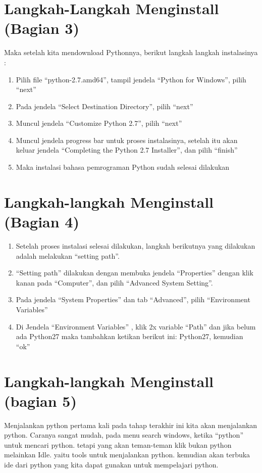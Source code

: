 \documentclass[12pt, times new roman, a4paper]{article}
\begin{document}
\section{Langkah-Langkah Menginstall (Bagian 3)}
Maka setelah kita mendownload Pythonnya, berikut langkah langkah instalasinya :
\begin{enumerate}
  \item Pilih file “python-2.7.amd64”, tampil jendela “Python for Windows”, pilih “next”
  \item Pada jendela “Select Destination Directory”, pilih “next”
  \item Muncul jendela “Customize Python 2.7”, pilih “next”
  \item Muncul jendela progress bar untuk proses instalasinya, setelah itu akan keluar jendela “Completing the Python 2.7 Installer”, dan pilih “finish”
  \item Maka instalasi bahasa pemrograman Python sudah selesai dilakukan
\end{enumerate}

\section{Langkah-langkah Menginstall (Bagian 4)}
\begin{enumerate}
  \item Setelah proses instalasi selesai dilakukan, langkah berikutnya yang
dilakukan adalah melakukan “setting path”.
  \item “Setting path” dilakukan dengan membuka jendela “Properties” dengan klik
kanan pada “Computer”, dan pilih “Advanced System Setting”.
  \item Pada jendela “System Properties” dan tab “Advanced”, pilih “Environment
Variables”
  \item Di Jendela “Environment Variables” , klik 2x variable “Path” dan
jika belum ada Python27 maka tambahkan ketikan berikut ini: Python27, kemudian “ok”
\end{enumerate}


\section{Langkah-langkah Menginstall (bagian 5)}
Menjalankan python pertama kali pada tahap terakhir ini kita akan menjalankan python. Caranya sangat mudah, pada menu search windows, ketika “python” untuk mencari python. tetapi yang akan teman-teman klik bukan python melainkan Idle. yaitu tools untuk menjalankan python. kemudian akan terbuka ide dari python yang kita dapat gunakan untuk mempelajari python.
\end{document}
